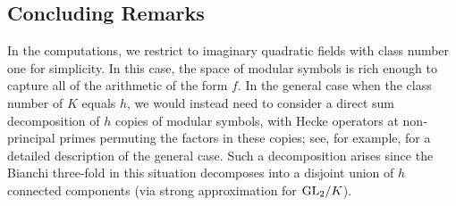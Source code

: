 \documentclass[a4paper,11pt]{article}
\newcommand{\cO}{\mathcal{O}}
\numberwithin{equation}{section}
\begin{document}
\begin{comment}
\subsection{Explicit Bianchi $p$-adic $L$-functions}
To compute the $p$-adic $L$-functions of \cite{Loe14}, there is an algorithm of the third author. The main result of \cite{Wil17} was a construction of a $p$-adic $L$-function attached to very general classes of Bianchi modular forms -- that is, modular forms over $K$ -- using a generalisation of Stevens' theory of \emph{overconvergent modular symbols}.  A particular feature of this approach, as explored for classical modular forms in \cite{PS11}, is its amenability to computation.

To $E/\Q$, one can attach a classical modular form $f$ under modularity, and through base-change this corresponds to a Bianchi modular form $\f$. By assumption, this will have level $N\cO_F$ prime to $p$, but for each prime $\pri|p$, there are two $\pri$-stabilisations to level $\pri N\cO_F$, and hence four $p$-stabilisations to level $pN\cO_F$. The four $p$-adic $L$-functions attached to these stabilisations in \cite{Wil17} are precisely those of \cite{Loe14}. We give a sketch of the explicit construction in \S\ref{sec:bianchi p-adic l-functions}.

We actually use a modified version of the construction of \cite{Wil17}. Existing code is much more developed for computations with arithmetic group cohomology, rather than modular symbols, so we develop a cohomological version of the construction. This approach, however, introduces new theoretical complications, which we explain and treat in the main text. In particular, it requires explicitly inverting the natural map from modular symbols to group cohomology.

\end{comment}



\subsection{Concluding Remarks}

In the computations, we restrict to imaginary quadratic fields with class number one for simplicity. In this case, the space of modular symbols is rich enough to capture all of the arithmetic of the form $f$. In the general case when the class number of $K$ equals $h$, we would instead need to consider a direct sum decomposition of $h$ copies of modular symbols, with Hecke operators at non-principal primes permuting the factors in these copies; see, for example, \cite{Wil17} for a detailed description of the general case. Such a decomposition arises since the Bianchi three-fold in this situation decomposes into a disjoint union of $h$ connected components (via strong approximation for $\mathrm{GL}_2/K$).
\end{document}
